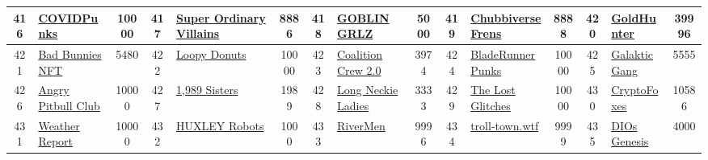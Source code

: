 \begin{table*}[]
{\begin{tabular}{|c|l|c|c|l|c|c|l|c|c|l|c|c|l|c|}
        416   & \href{https://covidpunks.com}{COVIDPunks}                                          & 10000             & 417   & \href{https://opensea.io/collection/super-ordinary-villains-genesis}{Super Ordinary Villains}     & 8886              & 418   & \href{https://twitter.com/goblingrlzwtf}{GOBLIN GRLZ}                             & 5000              & 419   & \href{https://www.chubbiverse.com/}{Chubbiverse Frens}                        & 8888              & 420   & \href{https://thegame.gold/}{GoldHunter}                                                  & 39996                                   \\ \hline
        421   & \href{https://badbunnies.xyz/}{Bad Bunnies NFT}                                    & 5480              & 422   & \href{https://loopyland.club}{Loopy Donuts}                                                       & 10000             & 423   & \href{http://www.ccrewnft.com}{Coalition Crew 2.0}                                & 3974              & 424   & \href{https://www.bladerunnerpunks.club/}{BladeRunner Punks}                  & 10000             & 425   & \href{https://galakticgang.com}{Galaktic Gang}                                            & 5555                                    \\ \hline
        426   & \href{http://angrypitbullclub.com}{Angry Pitbull Club}                             & 10000             & 427   & \href{https://blairbreitenstein.com/nft-collection}{1,989 Sisters}                                & 1989              & 428   & \href{https://nylahayes.com/}{Long Neckie Ladies}                                 & 3333              & 429   & \href{https://playlostglitches.com/}{The Lost Glitches}                       & 10000             & 430   & \href{https://cryptofoxes.io/}{CryptoFoxes}                                               & 10586                                   \\ \hline
        431   & \href{http://weathereport.io}{Weather Report}                                      & 10000             & 432   & \href{http://huxleysaga.com}{HUXLEY Robots}                                                       & 1000              & 433   & \href{https://rivermen.io/}{RiverMen}                                             & 9996              & 434   & \href{https://opensea.io/collection/troll-townwtf}{troll-town.wtf}            & 9999              & 435   & \href{https://diosnft.io/}{DIOs Genesis}                                                  & 4000                                    \\ \hline

\end{tabular}}
\end{table*}
